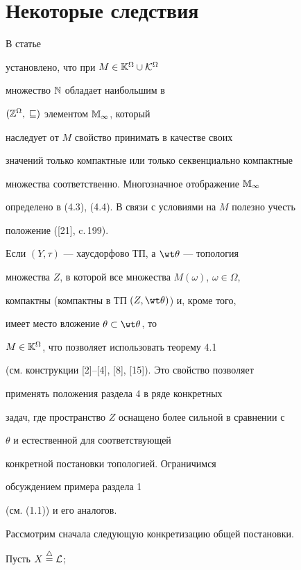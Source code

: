 \section{Некоторые следствия}





В статье


установлено, что при $M \in {{\Bbb K}^\Omega} \cup {{\cal K}^\Omega}$


множество ${\Bbb N}$ обладает наибольшим в


$({{\Bbb Z}^\Omega},\;\sqsubseteq)$ элементом ${\Bbb M}_\infty$, который


наследует от $M$ свойство принимать в качестве своих


значений только компактные или только секвенциально компактные


множества соответственно. Многозначное отображение ${\Bbb M}_\infty$


определено в (4.3), (4.4). В связи с условиями на $M$ полезно учесть


положение ([21], c.\,199).





Если $(Y,\tau)$ --- хаусдорфово ТП, а $\wt \theta$ --- топология


множества $Z$, в которой все множества ${M(\omega)}$, $\omega \in \Omega$,


компактны (компактны в ТП $(Z,{\wt \theta})$) и, кроме того,


имеет место вложение ${\theta} \subset {\wt \theta}$, то


$M \in {{\Bbb K}^\Omega}$, что позволяет использовать теорему 4.1


(см. конструкции [2]--[4], [8], [15]). Это свойство позволяет


применять положения раздела 4 в ряде конкретных


задач, где пространство $Z$ оснащено более сильной в сравнении с


$\theta$ и естественной для соответствующей


конкретной постановки топологией. Ограничимся


обсуждением примера раздела 1


(см. (1.1)) и его аналогов.





Рассмотрим сначала следующую конкретизацию общей постановки.


Пусть $X\overset{\triangle}{=}{} {\cal L}$;


